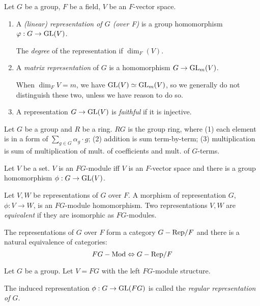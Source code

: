 \documentclass{article}
\begin{document}
\begin{definition}
  Let \(G\) be a group, \(F\) be a field, \(V\) be an \(F\)-vector space.
  \begin{enumerate}
  \item A \emph{(linear) representation of \(G\) (over F)} is a group homomorphism
    \(\varphi: G \to \textnormal{GL}(V)\).

    The \emph{degree} of the representation if \(\dim_F(V)\).
  \item A \emph{matrix representation} of \(G\) is a homomorphism
    \(G \to \textnormal{GL}_m(V)\).

    When \(\dim_F V = m\), we have \(\textnormal{GL}(V) \simeq \textnormal{GL}_m(V)\),
    so we generally do not distinguish these two,
    unless we have reason to do so.

  \item A representation \(G \to \textnormal{GL}(V)\) is \emph{faithful} if it is injective.
  \end{enumerate}
\end{definition}

\begin{definition}
  Let \(G\) be a group and \(R\) be a ring.
  \(RG\) is the group ring, where
  (1) each element is in a form of \(\sum_{g \in G} \alpha_g \cdot g\);
  (2) addition is sum term-by-term;
  (3) multiplication is sum of multiplication of mult. of coefficients
  and mult. of \(G\)-terms.
\end{definition}

\begin{lemma}
  Let \(V\) be a set.
  \(V\) is an \(FG\)-module
  iff
  \(V\) is an \(F\)-vector space and there is a group homomorphism
  \(\phi: G \to \textnormal{GL}(V)\).
\end{lemma}

\begin{definition}
  Let \(V, W\) be representations of \(G\) over \(F\).
  A morphism of representation \(G\), \(\phi: V \to W\), is an \(FG\)-module homomorphism.
  Two representations \(V, W\) are \emph{equivalent}
  if they are isomorphic as \(FG\)-modules.
\end{definition}

\begin{corollary}
  The representations of \(G\) over \(F\) form a category
  \(G-\textnormal{Rep}/F\)
  and there is a natural equivalence of categories:
  \[FG-\textnormal{Mod} \Leftrightarrow G-\textnormal{Rep}/F\]
\end{corollary}

\begin{definition}
  Let \(G\) be a group.
  Let \(V = FG\) with the left \(FG\)-module structure.

  The induced representation \(\phi: G \to \textnormal{GL}(FG)\) is called the
  \emph{regular representation of \(G\)}.
\end{definition}
\end{document}
